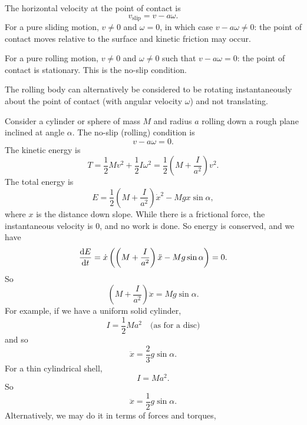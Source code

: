 The horizontal velocity at the point of contact is
\[
  v_{\text{slip}} = v - a\omega.
\]
For a pure sliding motion, $v \not = 0$ and $\omega = 0$, in which case $v - a\omega \not = 0$: the point of contact moves relative to the surface and kinetic friction may occur.

For a pure rolling motion, $v\not = 0$ and $\omega \not = 0$ such that $v - a\omega = 0$: the point of contact is stationary. This is the no-slip condition.

The rolling body can alternatively be considered to be rotating instantaneously about the point of contact (with angular velocity $\omega$) and not translating.

\begin{example}\leavevmode
  \begin{center}
  \end{center}
  Consider a cylinder or sphere of mass $M$ and radius $a$ rolling down a rough plane inclined at angle $\alpha$. The no-slip (rolling) condition is
  \[
    v - a\omega = 0 .
  \]
  The kinetic energy is
  \[
    T = \frac{1}{2}Mv^2 + \frac{1}{2}I\omega^2 = \frac{1}{2}\left(M + \frac{I}{a^2}\right)v^2.
  \]
  The total energy is
  \[
    E = \frac{1}{2}\left(M + \frac{I}{a^2}\right) \dot{x}^2 - Mgx\sin \alpha,
  \]
  where $x$ is the distance down slope. While there is a frictional force, the instantaneous velocity is $0$, and no work is done. So energy is conserved, and we have
  \[
    \frac{\mathrm{d} E}{\mathrm{d} t} = \dot{x}\left(\left(M + \frac{I}{a^2}\right)\ddot{x} - Mg\sin \alpha\right) = 0.
  \]
  So
  \[
    \left(M + \frac{I}{a^2}\right)\ddot{x} = Mg\sin \alpha.
  \]
  For example, if we have a uniform solid cylinder,
  \[
    I = \frac{1}{2}Ma^2\quad\text{(as for a disc)}
  \]
  and so
  \[
    \ddot{x} = \frac{2}{3}g\sin \alpha.
  \]
  For a thin cylindrical shell,
  \[
    I = Ma^2.
  \]
  So
  \[
    \ddot{x} = \frac{1}{2}g\sin \alpha.
  \]
  Alternatively, we may do it in terms of forces and torques,

\end{example}
